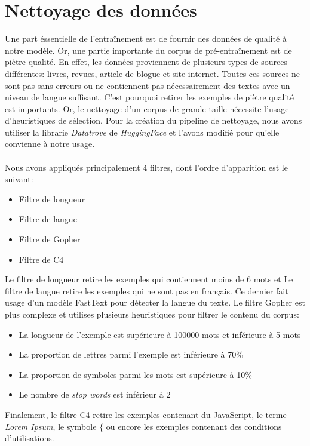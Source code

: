 \documentclass[12pt,twoside,maitrise]{dms}
\theoremstyle{definition}
\numberwithin{equation}{section}
\numberwithin{table}{chapter}
\numberwithin{figure}{chapter}
\begin{document}
\section{Nettoyage des données}
Une part éssentielle de l'entraînement est de fournir des données de qualité
à notre modèle. Or, une partie importante du corpus de pré-entraînement est
de piètre qualité. En effet, les données proviennent de plusieurs types de
sources différentes: livres, revues, article de blogue et site internet. Toutes
ces sources ne sont pas sans erreurs ou ne contiennent pas nécessairement des
textes avec un niveau de langue suffisant. C'est pourquoi retirer les exemples
de piètre qualité est importants. Or, le nettoyage d'un corpus de grande
taille nécessite l'usage d'heuristiques de sélection. Pour la création du
pipeline de nettoyage, nous avons utiliser la librarie \textit{Datatrove} de
\textit{HuggingFace} \cite{penedo2024datatrove} et l'avons modifié pour qu'elle
convienne à notre usage.\\
\\
Nous avons appliqués principalement 4 filtres, dont l'ordre d'apparition est le suivant:
\begin{itemize}
	\item Filtre de longueur
	\item Filtre de langue
	\item Filtre de Gopher
	\item Filtre de C4
\end{itemize}
Le filtre de longueur retire les exemples qui contiennent moins de 6 mots
et Le filtre de langue retire les exemples qui ne sont pas en français. Ce
dernier fait usage d'un modèle FastText \cite{joulin2016fasttext} pour détecter
la langue du texte. Le filtre Gopher est plus complexe et utilises plusieurs
heuristiques pour filtrer le contenu du corpus:
\begin{itemize}
	\item La longueur de l'exemple est supérieure à 100000 mots et inférieure à 5 mots
	\item La proportion de lettres parmi l'exemple est inférieure à 70\%
	\item La proportion de symboles parmi les mots est supérieure à 10\%
	\item Le nombre de \textit{stop words} est inférieur à 2
\end{itemize}
Finalement, le filtre C4 retire les exemples contenant du JavaScript, le terme
\textit{Lorem Ipsum}, le symbole $\{$  ou encore les exemples contenant des
conditions d'utilisations.\\
\end{document}
